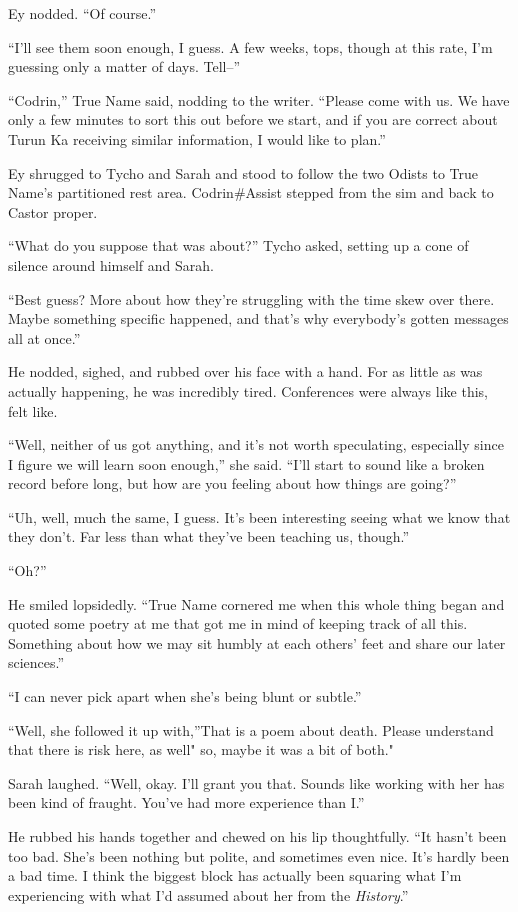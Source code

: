 Ey nodded. ``Of course.''

``I'll see them soon enough, I guess. A few weeks, tops, though at this rate, I'm guessing only a matter of days. Tell--''

``Codrin,'' True Name said, nodding to the writer. ``Please come with us. We have only a few minutes to sort this out before we start, and if you are correct about Turun Ka receiving similar information, I would like to plan.''

Ey shrugged to Tycho and Sarah and stood to follow the two Odists to True Name's partitioned rest area. Codrin\#Assist stepped from the sim and back to Castor proper.

``What do you suppose that was about?'' Tycho asked, setting up a cone of silence around himself and Sarah.

``Best guess? More about how they're struggling with the time skew over there. Maybe something specific happened, and that's why everybody's gotten messages all at once.''

He nodded, sighed, and rubbed over his face with a hand. For as little as was actually happening, he was incredibly tired. Conferences were always like this, felt like.

``Well, neither of us got anything, and it's not worth speculating, especially since I figure we will learn soon enough,'' she said. ``I'll start to sound like a broken record before long, but how are you feeling about how things are going?''

``Uh, well, much the same, I guess. It's been interesting seeing what we know that they don't. Far less than what they've been teaching us, though.''

``Oh?''

He smiled lopsidedly. ``True Name cornered me when this whole thing began and quoted some poetry at me that got me in mind of keeping track of all this. Something about how we may sit humbly at each others' feet and share our later sciences.''

``I can never pick apart when she's being blunt or subtle.''

``Well, she followed it up with,''That is a poem about death. Please understand that there is risk here, as well" so, maybe it was a bit of both."

Sarah laughed. ``Well, okay. I'll grant you that. Sounds like working with her has been kind of fraught. You've had more experience than I.''

He rubbed his hands together and chewed on his lip thoughtfully. ``It hasn't been too bad. She's been nothing but polite, and sometimes even nice. It's hardly been a bad time. I think the biggest block has actually been squaring what I'm experiencing with what I'd assumed about her from the \emph{History}.''

